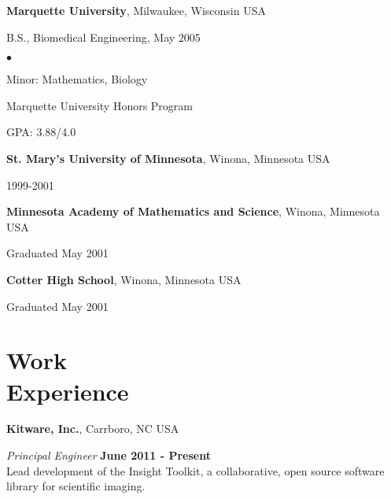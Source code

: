 \documentclass[margin,line]{res}
\newenvironment{list1}{
  \begin{list}{\ding{113}}{%
      \setlength{\itemsep}{0in}
      \setlength{\parsep}{0in} \setlength{\parskip}{0in}
      \setlength{\topsep}{0in} \setlength{\partopsep}{0in}
      \setlength{\leftmargin}{0.17in}}}{\end{list}}
\newenvironment{list2}{
  \begin{list}{$\bullet$}{%
      \setlength{\itemsep}{0in}
      \setlength{\parsep}{0in} \setlength{\parskip}{0in}
      \setlength{\topsep}{0in} \setlength{\partopsep}{0in}
      \setlength{\leftmargin}{0.2in}}}{\end{list}}
\begin{document}
\begin{resume}
{\bf Marquette University}, Milwaukee, Wisconsin USA\\
\vspace*{-.1in}
\begin{list1}
\item[] B.S., Biomedical Engineering, May 2005

\begin{list2}
 \vspace*{.05in}
 \item Minor: Mathematics, Biology
 \item Marquette University Honors Program
 \item GPA: 3.88/4.0
\end{list2}
\end{list1}

{\bf St. Mary's University of Minnesota}, Winona, Minnesota USA\\
\vspace*{-.1in}
\begin{list1}
\item[] 1999-2001
\end{list1}


{\bf Minnesota Academy of Mathematics and Science}, Winona, Minnesota USA\\
\vspace*{-.1in}
\begin{list1}
\item[] Graduated May 2001
\end{list1}

{\bf Cotter High School}, Winona, Minnesota USA\\
\vspace*{-.1in}
\begin{list1}
\item[] Graduated May 2001
\end{list1}

\section{\sc Work\\ Experience}

{\bf Kitware, Inc.}, Carrboro, NC USA

\vspace{-.3cm}
{\em Principal Engineer} \hfill {\bf June 2011 - Present} \\
Lead development of the Insight Toolkit, a collaborative, open source software library for scientific imaging.


\end{resume}
\end{document}

